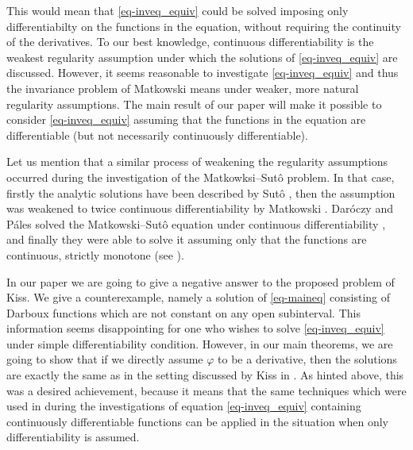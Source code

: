 \documentclass[12pt]{amsart}
\theoremstyle{remark}
\theoremstyle{definition}
\begin{document}
This would mean that \eqref{eq-inveq_equiv} could 
be solved imposing only differentiabilty on the 
functions in the equation, 
without requiring the continuity of the derivatives. 
To our best knowledge, 
continuous differentiability is 
the weakest regularity assumption under which 
the solutions of \eqref{eq-inveq_equiv} are discussed. 
However, it seems reasonable to investigate 
\eqref{eq-inveq_equiv} and thus the invariance problem of 
Matkowski means under weaker, more natural 
regularity assumptions. 
The main result of our paper will make it possible 
to consider \eqref{eq-inveq_equiv} 
assuming that the functions in the equation are 
differentiable (but not necessarily continuously 
differentiable). 

Let us mention that a similar process of 
weakening the regularity assumptions occurred during 
the investigation of the Matkowksi--Sut\^o problem. 
In that case, firstly 
the analytic solutions have been described by 
Sut\^o \cite{Sut14a, Sut14b}, 
then the assumption was weakened to 
twice continuous differentiability 
by Matkowski \cite{Mat99}. 
Dar\'oczy and P\'ales solved the Matkowski--Sut\^o 
equation under continuous differentiability 
\cite{DP01}, and finally they were able to 
solve it assuming only that the functions 
are continuous, strictly monotone (see \cite{DP02}). 

In our paper we are going to give a negative answer 
to the proposed problem of Kiss. 
We give a counterexample, namely a solution of 
\eqref{eq-maineq} consisting of Darboux functions 
which are not constant on any open subinterval. 
This information seems disappointing for one who 
wishes to solve \eqref{eq-inveq_equiv} under 
simple differentiability condition. 
However, in our main theorems, 
we are going to show that if we directly assume 
$ \varphi $ to be a derivative, then the 
solutions are exactly the same as in the setting 
discussed by Kiss in \cite{Kis24}. 
As hinted above, this was a desired achievement, 
because it means 
that the same techniques which were used 
in \cite{Kis22} during the 
investigations of equation \eqref{eq-inveq_equiv} 
containing continuously differentiable functions 
can be applied in the situation when only 
differentiability is assumed. 
\end{document}
